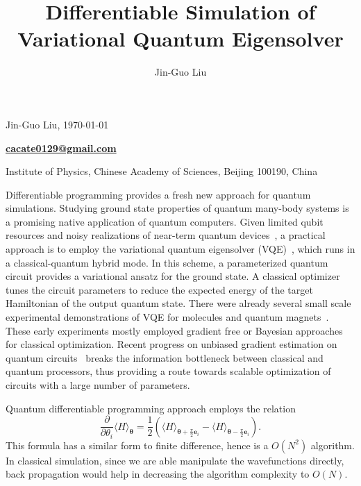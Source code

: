 \documentclass[aps,longbibliography,english,superscriptaddress,prx]{revtex4-1}
\makeatletter
\newcommand{\<}{\langle}
\renewcommand{\>}{\rangle}
\newcommand{\vtheta}{{\boldsymbol{\theta}}}
\renewcommand\maketitle{
\begin{center}
    \phantom{.}
    \vspace{1cm}
    {\Large \bf \@title\par}
    \vspace{0.7cm}
    {Jin-Guo Liu, \;\;\today\par}
    \vspace{0.1cm}
    {\bf \href{mailto:cacate0129@gmail.com}{cacate0129@gmail.com}\par}
    \vspace{0.3cm}
    {Institute of Physics, Chinese Academy of Sciences, Beijing 100190, China}
\end{center}
}
\makeatother
\begin{document}
\title{Differentiable Simulation of Variational Quantum Eigensolver}
\author{Jin-Guo Liu}
\maketitle
\vspace{0.5cm}

Differentiable programming provides a fresh new approach for quantum simulations.
Studying ground state properties of quantum many-body systems is a promising native application of quantum computers. Given limited qubit resources and noisy realizations of near-term quantum  devices~\cite{Preskill2018, Boixo2018}, a practical approach is to employ the variational quantum eigensolver (VQE)~\cite{Peruzzo2014, Jarrod2016, Wecker2015a, Wecker2015b, McArdle2018, Cao2018, Liu2019}, which runs in a classical-quantum hybrid mode.
In this scheme, a parameterized quantum circuit provides a variational ansatz for the ground state. A classical optimizer tunes the circuit parameters to reduce the expected energy of the target Hamiltonian of the output quantum state. There were already several small scale experimental demonstrations of VQE for molecules and quantum magnets~\cite{Shen2017, OMalley2016, Kandala2017,Colless2018, Hempel2018}. These early experiments mostly employed gradient free or Bayesian approaches for classical optimization. Recent progress on unbiased gradient estimation on quantum circuits~\cite{Li2017a, Mitarai2018, Liu2018, Verdon2018, Schuld2018, Javier2018, Bergholm2018, Guerreschi2017,Farhi2018,Romero2018,Harrow2019,Dallaire2018} breaks the information bottleneck between classical and quantum processors, thus
providing a route towards scalable optimization of circuits with a large number of parameters.

Quantum differentiable programming approach employs the relation~\cite{Mitarai2018}
\begin{equation}\label{eq-grad}
    \frac \partial{\partial \theta_i}\<H\>_{\vtheta} = \frac 1 2\left( \langle {H} \rangle_{\vtheta+ \frac \pi 2 \boldsymbol{e}_i} - \langle {H} \rangle_{\vtheta- \frac \pi 2 \boldsymbol{e}_i}\right).
\end{equation}
This formula has a similar form to finite difference, hence is a $O(N^2)$ algorithm. In classical simulation, since we are able manipulate the wavefunctions directly, back propagation would help in decreasing the algorithm complexity to $O(N)$.
\end{document}
